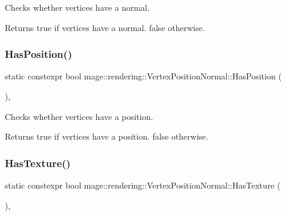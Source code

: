 Checks whether vertices have a normal.

\begin{DoxyReturn}{Returns}
{\ttfamily true} if vertices have a normal. {\ttfamily false} otherwise. 
\end{DoxyReturn}
\mbox{\label{structmage_1_1rendering_1_1_vertex_position_normal_a90efd74233b76b071a322d737caf3abf}} 
\subsubsection{\texorpdfstring{Has\+Position()}{HasPosition()}}
{\footnotesize\ttfamily static constexpr bool mage\+::rendering\+::\+Vertex\+Position\+Normal\+::\+Has\+Position (\begin{DoxyParamCaption}{ }\end{DoxyParamCaption})\hspace{0.3cm}{\ttfamily [static]}, {\ttfamily [noexcept]}}

Checks whether vertices have a position.

\begin{DoxyReturn}{Returns}
{\ttfamily true} if vertices have a position. {\ttfamily false} otherwise. 
\end{DoxyReturn}
\mbox{\label{structmage_1_1rendering_1_1_vertex_position_normal_a40b091a64d0b5b2c2a07b382cd546589}} 
\subsubsection{\texorpdfstring{Has\+Texture()}{HasTexture()}}
{\footnotesize\ttfamily static constexpr bool mage\+::rendering\+::\+Vertex\+Position\+Normal\+::\+Has\+Texture (\begin{DoxyParamCaption}{ }\end{DoxyParamCaption})\hspace{0.3cm}{\ttfamily [static]}, {\ttfamily [noexcept]}}

